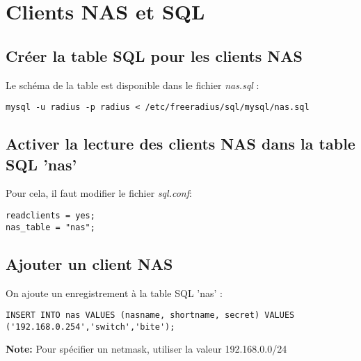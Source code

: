 \section{Clients NAS et SQL}

\subsection{Créer la table SQL pour les clients NAS}

Le schéma de la table est disponible dans le fichier \textit{nas.sql} :

\begin{verbatim}
mysql -u radius -p radius < /etc/freeradius/sql/mysql/nas.sql
\end{verbatim}

\subsection{Activer la lecture des clients NAS dans la table SQL 'nas'}

Pour cela, il faut modifier le fichier \textit{sql.conf}:

\begin{verbatim}
readclients = yes;
nas_table = "nas";
\end{verbatim}

\subsection{Ajouter un client NAS}

On ajoute un enregistrement à la table SQL 'nas' :

\begin{verbatim}
INSERT INTO nas VALUES (nasname, shortname, secret) VALUES ('192.168.0.254','switch','bite');
\end{verbatim}

\textbf{Note:} Pour spécifier un netmask, utiliser la valeur 192.168.0.0/24

